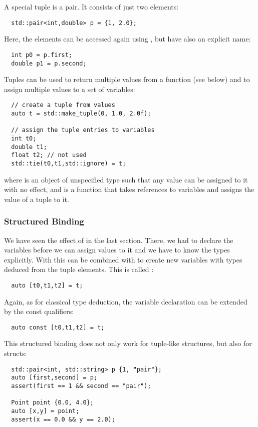 A special tuple is a pair. It consists of just two elements:
%
\begin{verbatim}
  std::pair<int,double> p = {1, 2.0};
\end{verbatim}
%
Here, the elements can be accessed again using , but have also an explicit name:
%
\begin{verbatim}
  int p0 = p.first;
  double p1 = p.second;
\end{verbatim}

Tuples can be used to return multiple values from a function (see below) and to assign multiple values to a set of
variables:
%
\begin{verbatim}
  // create a tuple from values
  auto t = std::make_tuple(0, 1.0, 2.0f);

  // assign the tuple entries to variables
  int t0;
  double t1;
  float t2; // not used
  std::tie(t0,t1,std::ignore) = t;
\end{verbatim}
%
where  is an object of unspecified type such that any value can be assigned to it with no effect, and
 is a function that takes references to variables and assigns the value of a tuple to it.


\subsubsection{Structured Binding}
We have seen the effect of  in the last section. There, we had to declare the variables before we can assign
values to it and we have to know the types explicitly. With\marginpar{[\cxx{17}]}  this can be combined with 
to create new variables with types deduced from the tuple elements. This is called :
%
\begin{verbatim}
  auto [t0,t1,t2] = t;
\end{verbatim}
%
Again, as for classical  type deduction, the variable declaration can be extended by the const
qualifiers:
%
\begin{verbatim}
  auto const [t0,t1,t2] = t;
\end{verbatim}


This structured binding does not only work for tuple-like structures, but also for structs:
%
\begin{verbatim}
  std::pair<int, std::string> p {1, "pair"};
  auto [first,second] = p;
  assert(first == 1 && second == "pair");

  Point point {0.0, 4.0};
  auto [x,y] = point;
  assert(x == 0.0 && y == 2.0);
\end{verbatim}